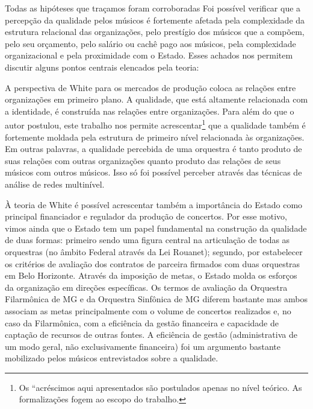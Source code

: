 \documentclass[a4paper, 12pt, openright, oneside, german, french, english, brazil]{abntex2}
\begin{document}
	
	Todas as hipóteses que traçamos foram corroboradas Foi possível verificar que a percepção da qualidade pelos músicos é fortemente afetada pela complexidade da estrutura relacional das organizações, pelo prestígio dos músicos que a compõem, pelo seu orçamento, pelo salário ou cachê pago aos músicos, pela complexidade organizacional e pela proximidade com o Estado. Esses achados nos permitem discutir alguns pontos centrais elencados pela teoria:
	
	A perspectiva de White para os mercados de produção coloca as relações entre organizações em primeiro plano. A qualidade, que está altamente relacionada com a identidade, é construída nas relações entre organizações. Para além do que o autor postulou, este trabalho nos permite acrescentar\footnote{Os ``acréscimos aqui apresentados são postulados apenas no nível teórico. As formalizações fogem ao escopo do trabalho.} que a qualidade também é fortemente moldada pela estrutura de primeiro nível relacionada às organizações. Em outras palavras, a qualidade percebida de uma orquestra é tanto produto de suas relações com outras organizações quanto produto das relações de seus músicos com outros músicos. Isso só foi possível perceber através das técnicas de análise de redes multinível.
	
	À teoria de White é possível acrescentar também a importância do Estado como principal financiador e regulador da produção de concertos. Por esse motivo, vimos ainda que o Estado tem um papel fundamental na construção da qualidade de duas formas: primeiro sendo uma figura central na articulação de todas as orquestras (no âmbito Federal através da Lei Rouanet); segundo, por estabelecer os critérios de avaliação dos contratos de parceira firmados com duas orquestras em Belo Horizonte. Através da imposição de metas, o Estado molda os esforços da organização em direções específicas. Os termos de avaliação da Orquestra Filarmônica de MG e da Orquestra Sinfônica de MG diferem bastante mas ambos associam as metas principalmente com o volume de concertos realizados e, no caso da Filarmônica, com a eficiência da gestão financeira e capacidade de captação de recursos de outras fontes. A eficiência de gestão (administrativa de um modo geral, não exclusivamente financeira) foi um argumento bastante mobilizado pelos músicos entrevistados sobre a qualidade.
	
\end{document}

